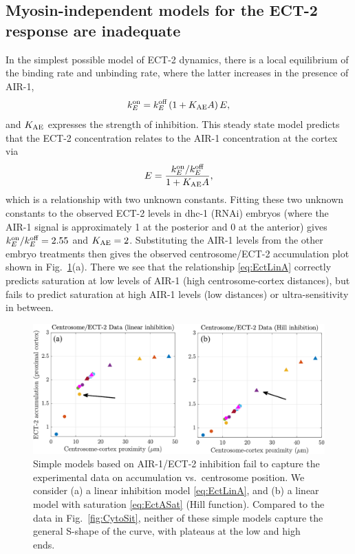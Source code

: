 \documentclass[11pt]{article}
\begin{document}
\begin{appendix}
\subsection{Myosin-independent models for the ECT-2 response are inadequate}
In the simplest possible model of ECT-2 dynamics, there is a local equilibrium of the binding rate and unbinding rate, where the latter increases in the presence of AIR-1,
\begin{equation}
\label{eq:EctA}
 k^\text{on}_E = k^\text{off}_E \left(1+K_\text{AE} A \right)E,
\end{equation}
and $K_\text{AE}$ expresses the strength of inhibition. This steady state model predicts that the ECT-2 concentration relates to the AIR-1 concentration at the cortex via
\begin{equation}
\label{eq:EctLinA}
E = \frac{k^\text{on}_E/ k^\text{off}_E}{ 1+K_\text{AE} A},
\end{equation}
which is a relationship with two unknown constants. Fitting these two unknown constants to the observed ECT-2 levels in dhc-1 (RNAi) embryos (where the AIR-1 signal is approximately 1 at the posterior and 0 at the anterior) gives $k^\text{on}_E/ k^\text{off}_E=2.55$ and $K_\text{AE}=2$. Substituting the AIR-1 levels from the other embryo treatments then gives the observed centrosome/ECT-2 accumulation plot shown in Fig.\ \ref{fig:LinFail}(a). There we see that the relationship \eqref{eq:EctLinA} correctly predicts saturation at low levels of AIR-1 (high centrosome-cortex distances), but fails to predict saturation at high AIR-1 levels (low distances) or ultra-sensitivity in between. 

\begin{figure}
\centering
\includegraphics[width=\textwidth]{Glotzer/Fig3/Fig3-crop.pdf}
\caption{\label{fig:LinFail}Simple models based on AIR-1/ECT-2 inhibition fail to capture the experimental data on accumulation vs.\ centrosome position. We consider (a) a linear inhibition model \eqref{eq:EctLinA}, and (b) a linear model with saturation \eqref{eq:EctASat} (Hill function). Compared to the data in Fig.\ \ref{fig:CytoSit}, neither of these simple models capture the general S-shape of the curve, with plateaus at the low and high ends. }
\end{figure}


\end{appendix}
\end{document}
